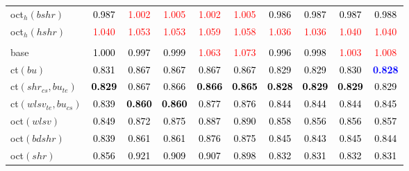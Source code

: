 \begin{tabular}[t]{l|ccccccccc}
oct$_h(bshr)$ & \textcolor{black}{0.987} & \textcolor{red}{1.002} & \textcolor{red}{1.005} & \textcolor{red}{1.002} & \textcolor{red}{1.005} & \textcolor{black}{0.986} & \textcolor{black}{0.987} & \textcolor{black}{0.987} & \textcolor{black}{0.988}\\
oct$_h(hshr)$ & \textcolor{red}{1.040} & \textcolor{red}{1.053} & \textcolor{red}{1.053} & \textcolor{red}{1.059} & \textcolor{red}{1.058} & \textcolor{red}{1.036} & \textcolor{red}{1.036} & \textcolor{red}{1.040} & \textcolor{red}{1.040}\\
\addlinespace[0.3em]
\multicolumn{10}{c}{\textbf{$k = 2$}}\\
base & \textcolor{black}{1.000} & \textcolor{black}{0.997} & \textcolor{black}{0.999} & \textcolor{red}{1.063} & \textcolor{red}{1.073} & \textcolor{black}{0.996} & \textcolor{black}{0.998} & \textcolor{red}{1.003} & \textcolor{red}{1.008}\\
ct$(bu)$ & \textcolor{black}{0.831} & \textcolor{black}{0.867} & \textcolor{black}{0.867} & \textcolor{black}{0.867} & \textcolor{black}{0.867} & \textcolor{black}{0.829} & \textcolor{black}{0.829} & \textcolor{black}{0.830} & \textcolor{blue}{\textbf{0.828}}\\
ct$(shr_{cs}, bu_{te})$ & \textcolor{black}{\textbf{0.829}} & \textcolor{black}{0.867} & \textcolor{black}{0.866} & \textcolor{black}{\textbf{0.866}} & \textcolor{black}{\textbf{0.865}} & \textcolor{black}{\textbf{0.828}} & \textcolor{black}{\textbf{0.829}} & \textcolor{black}{\textbf{0.829}} & \textcolor{black}{0.829}\\
ct$(wlsv_{te}, bu_{cs})$ & \textcolor{black}{0.839} & \textcolor{black}{\textbf{0.860}} & \textcolor{black}{\textbf{0.860}} & \textcolor{black}{0.877} & \textcolor{black}{0.876} & \textcolor{black}{0.844} & \textcolor{black}{0.844} & \textcolor{black}{0.844} & \textcolor{black}{0.845}\\
oct$(wlsv)$ & \textcolor{black}{0.849} & \textcolor{black}{0.872} & \textcolor{black}{0.875} & \textcolor{black}{0.887} & \textcolor{black}{0.890} & \textcolor{black}{0.858} & \textcolor{black}{0.856} & \textcolor{black}{0.856} & \textcolor{black}{0.857}\\
oct$(bdshr)$ & \textcolor{black}{0.839} & \textcolor{black}{0.861} & \textcolor{black}{0.861} & \textcolor{black}{0.876} & \textcolor{black}{0.875} & \textcolor{black}{0.845} & \textcolor{black}{0.843} & \textcolor{black}{0.845} & \textcolor{black}{0.844}\\
oct$(shr)$ & \textcolor{black}{0.856} & \textcolor{black}{0.921} & \textcolor{black}{0.909} & \textcolor{black}{0.907} & \textcolor{black}{0.898} & \textcolor{black}{0.832} & \textcolor{black}{0.831} & \textcolor{black}{0.832} & \textcolor{black}{0.831}\\

\end{tabular}
